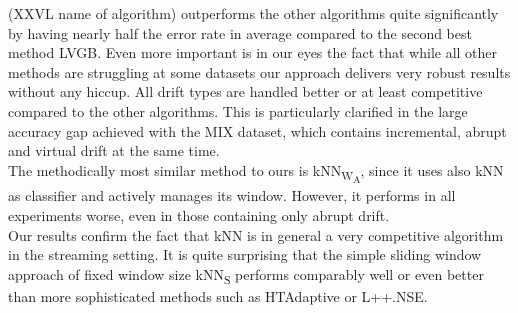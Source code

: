 \documentclass[conference]{IEEEtran}
\begin{document}
(XXVL name of algorithm) outperforms the other algorithms quite significantly by having nearly half the error rate in average compared to the second best method LVGB. 
Even more important is in our eyes the fact that while all other methods are struggling at some datasets our approach delivers very robust results without any hiccup. All drift types are handled
better or at least competitive compared to the other algorithms. This is particularly clarified in the large accuracy gap achieved with the MIX dataset, which contains incremental, 
abrupt and virtual drift at the same time. \\
The methodically most similar method to ours is kNN\textsubscript{W\textsubscript{A}}, since it uses also kNN as classifier and actively manages its window.
However, it performs in all experiments worse, even in those containing only abrupt drift.\\
Our results confirm the fact that kNN is in general a very competitive algorithm in the streaming setting. It is quite surprising that the simple sliding window approach of fixed window size
kNN\textsubscript{S} performs comparably well or even better than more sophisticated methods such as HTAdaptive or L++.NSE.
\end{document}
